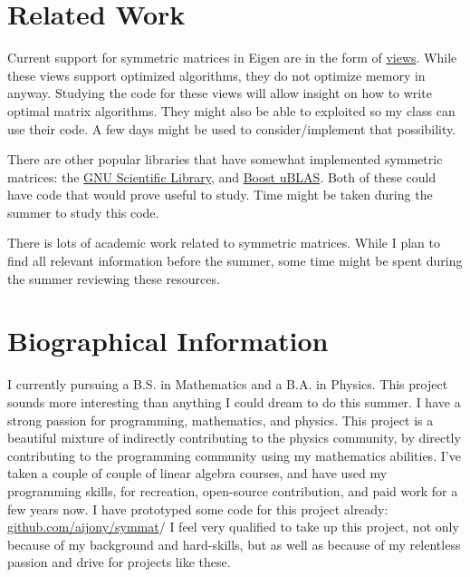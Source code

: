 \documentclass[aps,prl,reprint,groupedaddress,nofootinbib]{revtex4-1}
\begin{document}
\section{Related Work}
\label{sec:org0386ff9}

Current support for symmetric matrices in Eigen are in the form of \href{https://eigen.tuxfamily.org/dox/group\_\_QuickRefPage.html\#title15}{views}.
While these views support optimized algorithms,
they do not optimize memory in anyway.
Studying the code for these views will allow 
insight on how to write optimal matrix algorithms.
They might also be able to exploited so my class can use their code.
A few days might be used to consider/implement that possibility. 

There are other popular libraries that have somewhat implemented symmetric matrices:
the \href{https://www.gnu.org/software/gsl/manual/html\_node/Real-Symmetric-Matrices.html}{GNU Scientific Library}, and \href{http://www.boost.org/doc/libs/1\_66\_0/libs/numeric/ublas/doc/symmetric.html}{Boost uBLAS}.
Both of these could have code that would prove useful to study.
Time might be taken during the summer to study this code.

There is lots of academic work related to symmetric matrices.
While I plan to find all relevant information before the summer,
some time might be spent during the summer reviewing these resources.

\section{Biographical Information}
\label{sec:org63b55e6}

I currently pursuing a B.S. in Mathematics and a B.A. in Physics.
This project sounds more interesting than anything I could dream to do this summer.
I have a strong passion for programming, mathematics, and physics.
This project is a beautiful mixture of indirectly contributing to the physics community,
by directly contributing to the programming community using my mathematics abilities.
I've taken a couple of couple of linear algebra courses, and have used my programming skills,
for recreation, open-source contribution, and paid work for a few years now.
I have prototyped some code for this project already: \href{https://github.com/aijony/symmat}{github.com/aijony/symmat}/
I feel very qualified to take up this project,
not only because of my background and hard-skills, but as well as because
of my relentless passion and drive for projects like these.
\end{document}
